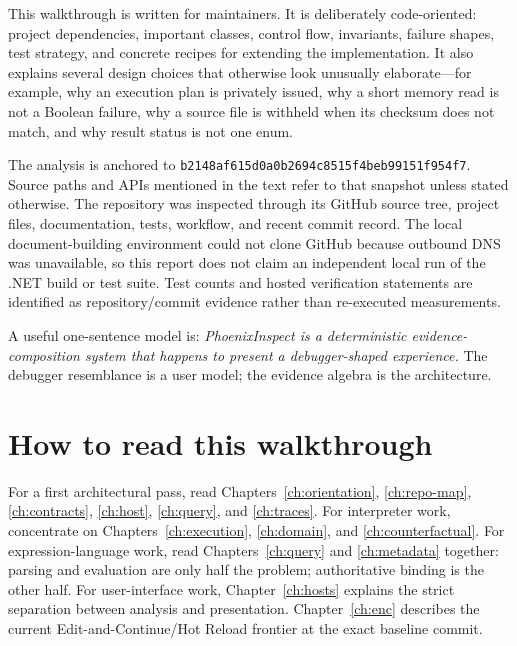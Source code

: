 \documentclass[11pt,oneside,openany]{book}
\newcommand{\commit}{\texttt{b2148af615d0a0b2694c8515f4beb99151f954f7}}
\begin{document}
This walkthrough is written for maintainers. It is deliberately code-oriented: project dependencies, important classes, control flow, invariants, failure shapes, test strategy, and concrete recipes for extending the implementation. It also explains several design choices that otherwise look unusually elaborate---for example, why an execution plan is privately issued, why a short memory read is not a Boolean failure, why a source file is withheld when its checksum does not match, and why result status is not one enum.

The analysis is anchored to \commit. Source paths and APIs mentioned in the text refer to that snapshot unless stated otherwise. The repository was inspected through its GitHub source tree, project files, documentation, tests, workflow, and recent commit record. The local document-building environment could not clone GitHub because outbound DNS was unavailable, so this report does not claim an independent local run of the .NET build or test suite. Test counts and hosted verification statements are identified as repository/commit evidence rather than re-executed measurements.

\begin{takeaway}
A useful one-sentence model is: \emph{PhoenixInspect is a deterministic evidence-composition system that happens to present a debugger-shaped experience.} The debugger resemblance is a user model; the evidence algebra is the architecture.
\end{takeaway}

\chapter*{How to read this walkthrough}

For a first architectural pass, read Chapters~\ref{ch:orientation}, \ref{ch:repo-map}, \ref{ch:contracts}, \ref{ch:host}, \ref{ch:query}, and \ref{ch:traces}. For interpreter work, concentrate on Chapters~\ref{ch:execution}, \ref{ch:domain}, and \ref{ch:counterfactual}. For expression-language work, read Chapters~\ref{ch:query} and \ref{ch:metadata} together: parsing and evaluation are only half the problem; authoritative binding is the other half. For user-interface work, Chapter~\ref{ch:hosts} explains the strict separation between analysis and presentation. Chapter~\ref{ch:enc} describes the current Edit-and-Continue/Hot Reload frontier at the exact baseline commit.
\end{document}
